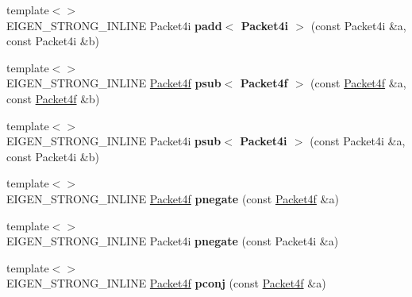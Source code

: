 \begin{DoxyCompactItemize}
{\footnotesize template$<$$>$ }\\E\+I\+G\+E\+N\+\_\+\+S\+T\+R\+O\+N\+G\+\_\+\+I\+N\+L\+I\+NE Packet4i {\bfseries padd$<$ Packet4i $>$} (const Packet4i \&a, const Packet4i \&b)
\item 
\mbox{\label{namespace_eigen_1_1internal_ae2c3800ca35b419558f193185ca79a35}} 
{\footnotesize template$<$$>$ }\\E\+I\+G\+E\+N\+\_\+\+S\+T\+R\+O\+N\+G\+\_\+\+I\+N\+L\+I\+NE \hyperlink{struct_eigen_1_1internal_1_1_packet4f}{Packet4f} {\bfseries psub$<$ Packet4f $>$} (const \hyperlink{struct_eigen_1_1internal_1_1_packet4f}{Packet4f} \&a, const \hyperlink{struct_eigen_1_1internal_1_1_packet4f}{Packet4f} \&b)
\item 
\mbox{\label{namespace_eigen_1_1internal_a9694e7fa41c9bf4998fb8f4a5ea0da53}} 
{\footnotesize template$<$$>$ }\\E\+I\+G\+E\+N\+\_\+\+S\+T\+R\+O\+N\+G\+\_\+\+I\+N\+L\+I\+NE Packet4i {\bfseries psub$<$ Packet4i $>$} (const Packet4i \&a, const Packet4i \&b)
\item 
\mbox{\label{namespace_eigen_1_1internal_aed3b9988dbae5842d626ea606eb6b595}} 
{\footnotesize template$<$$>$ }\\E\+I\+G\+E\+N\+\_\+\+S\+T\+R\+O\+N\+G\+\_\+\+I\+N\+L\+I\+NE \hyperlink{struct_eigen_1_1internal_1_1_packet4f}{Packet4f} {\bfseries pnegate} (const \hyperlink{struct_eigen_1_1internal_1_1_packet4f}{Packet4f} \&a)
\item 
\mbox{\label{namespace_eigen_1_1internal_abb7e561b91aaf85a72025e78680b4843}} 
{\footnotesize template$<$$>$ }\\E\+I\+G\+E\+N\+\_\+\+S\+T\+R\+O\+N\+G\+\_\+\+I\+N\+L\+I\+NE Packet4i {\bfseries pnegate} (const Packet4i \&a)
\item 
\mbox{\label{namespace_eigen_1_1internal_ad1ed084e8b17458cc7a6393aad90e8f7}} 
{\footnotesize template$<$$>$ }\\E\+I\+G\+E\+N\+\_\+\+S\+T\+R\+O\+N\+G\+\_\+\+I\+N\+L\+I\+NE \hyperlink{struct_eigen_1_1internal_1_1_packet4f}{Packet4f} {\bfseries pconj} (const \hyperlink{struct_eigen_1_1internal_1_1_packet4f}{Packet4f} \&a)
\item 
\mbox{\label{namespace_eigen_1_1internal_a5e7e367b9f82f6f704da66942b180e50}} 

\end{DoxyCompactItemize}
